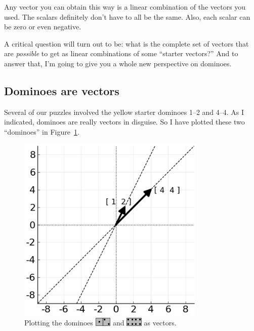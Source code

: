 Any vector you can obtain this way is a linear combination of the vectors you
used. The scalars definitely don't have to all be the same. Also, each scalar
can be zero or even negative.

A critical question will turn out to be: what is the complete set of vectors
that are \textit{possible} to get as linear combinations of some ``starter
vectors?'' And to answer that, I'm going to give you a whole new perspective on
dominoes.

\subsection{Dominoes are vectors}

Several of our puzzles involved the yellow starter dominoes 1--2 and 4--4. As I
indicated, dominoes are really vectors in disguise. So I have plotted these two
``dominoes'' in Figure~\ref{fig:yellowVectors}.

\begin{figure}[ht]
\centering
\includegraphics[width=0.8\textwidth]{yellowVectors.png}
\caption{Plotting the dominoes
\protect\includegraphics[width=0.07\textwidth]{gray1_2.png} and
\protect\includegraphics[width=0.07\textwidth]{gray4_4.png} as vectors.}
\label{fig:yellowVectors}
\end{figure}

